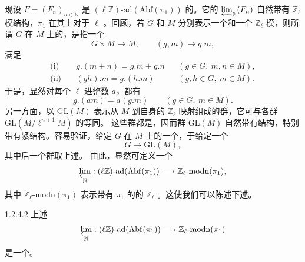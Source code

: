 现设 $F=(F_n)_{n\in\mathbb N}$ 是 $(\ell\mathbb Z)\text{-}\mathrm{ad}(\mathrm{Abf}(\pi_1))$ 的。它的 $\varprojlim_{\mathbb N}(F_n)$ 自然带有 $\mathbb Z_\ell$ 模结构，$\pi_1$ 在其上对于 $\ell$ 。回顾，若 $G$ 和 $M$ 分别表示一个和一个 $\mathbb Z_\ell$ 模，则所谓 $G$ 在 $M$ 上的，是指一个
\[
G\times M\longrightarrow M,\qquad(g,m)\longmapsto g.m,
\]
满足
\[
\begin{aligned}
\text{(i)}\quad&g.(m+n)=g.m+g.n&&(g\in G,\ m,n\in M),\\
\text{(ii)}\quad&(gh).m=g.(h.m)&&(g,h\in G,\ m\in M).
\end{aligned}
\]
于是，显然对每个 $\ell$ 进整数 $a$，都有
\[
g.(am)=a(g.m)\qquad(g\in G,\ m\in M).
\]
另一方面，以 $\mathrm{GL}(M)$ 表示从 $M$ 到自身的 $\mathbb Z_\ell$ 映射组成的群，它可与各群 $\mathrm{GL}(M/\ell^{n+1}M)$ 的等同。
这些群都是，因而群 $\mathrm{GL}(M)$ 自然带有结构，特别带有紧结构。容易验证，给定 $G$ 在 $M$ 上的一个，于给定一个
\[
G\longrightarrow\mathrm{GL}(M),
\]
其中后一个群取上述。
由此，显然可定义一个
\[
\varprojlim_{\mathbb N}:(\ell\mathbb Z)\text{-}\mathrm{ad}(\mathrm{Abf}(\pi_1))
\longrightarrow\mathbb Z_\ell\text{-}\mathrm{modn}(\pi_1),
\]
其中 $\mathbb Z_\ell\text{-}\mathrm{modn}(\pi_1)$ 表示带有 $\pi_1$ 的的 $\mathbb Z_\ell$ 。这使我们可以陈述下述。
\begin{SGAresult}{}{1.2.4.2}
上述
\[
\varprojlim_{\mathbb N}:(\ell\mathbb Z)\text{-}\mathrm{ad}(\mathrm{Abf}(\pi_1))
\longrightarrow\mathbb Z_\ell\text{-}\mathrm{modn}(\pi_1)
\]
是一个。
\end{SGAresult}
